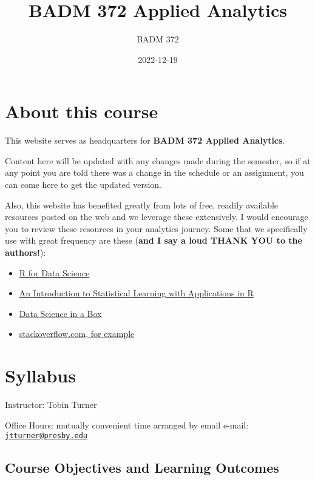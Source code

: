 \documentclass[
]{book}
\title{BADM 372 Applied Analytics}
\author{BADM 372}
\date{2022-12-19}
\providecommand{\tightlist}{%
  \setlength{\itemsep}{0pt}\setlength{\parskip}{0pt}}
\begin{document}
\maketitle

{
\setcounter{tocdepth}{1}
\tableofcontents
}
\hypertarget{about-this-course}{%
\chapter{About this course}\label{about-this-course}}

This website serves as headquarters for \textbf{BADM 372 Applied Analytics}.

Content here will be updated with any changes made during the semester, so if at any point you are told there was a change in the schedule or an assignment, you can come here to get the updated version.

Also, this website has benefited greatly from lots of free, readily available resources posted on the web and we leverage these extensively. I would encourage you to review these resources in your analytics journey. Some that we specifically use with great frequency are these (\textbf{and I say a loud THANK YOU to the authors!}):

\begin{itemize}
\tightlist
\item
  \href{https://r4ds.had.co.nz/}{R for Data Science}
\item
  \href{https://trevorhastie.github.io/ISLR/}{An Introduction to Statistical Learning with Applications in R}
\item
  \href{https://datasciencebox.org/}{Data Science in a Box}
\item
  \href{https://stackoverflow.com/questions/4862178/remove-rows-with-all-or-some-nas-missing-values-in-data-frame?rq=1}{stackoverflow.com, for example}
\end{itemize}

\hypertarget{syllabus}{%
\chapter{Syllabus}\label{syllabus}}

Instructor: Tobin Turner

Office Hours: mutually convenient time arranged by email e-mail: \href{mailto:jtturner@presby.edu}{\nolinkurl{jtturner@presby.edu}}

\hypertarget{course-objectives-and-learning-outcomes}{%
\section{Course Objectives and Learning Outcomes}\label{course-objectives-and-learning-outcomes}}
\end{document}
